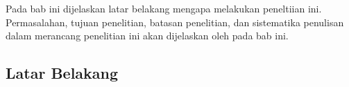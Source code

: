 \chapter{\babSatu}
Pada bab ini dijelaskan latar belakang mengapa \saya melakukan peneltiian ini. Permasalahan, tujuan penelitian, batasan penelitian, dan sistematika penulisan dalam merancang penelitian ini akan dijelaskan oleh \saya pada bab ini.

\section{Latar Belakang}

